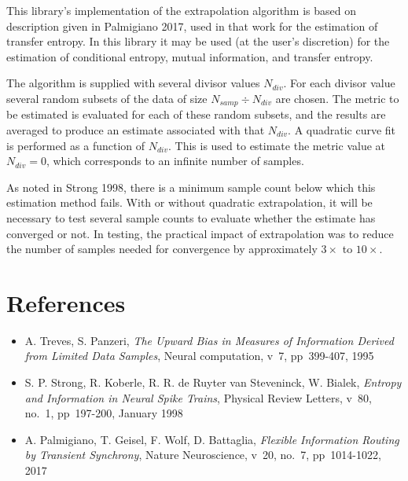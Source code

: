 This library's implementation of the extrapolation algorithm is based on
description given in Palmigiano 2017, used in that work for the estimation
of transfer entropy. In this library it may be used (at the user's
discretion) for the estimation of conditional entropy, mutual information,
and transfer entropy.

The algorithm is supplied with several divisor values $N_{div}$. For each
divisor value several random subsets of the data of size $N_{samp}
\div N_{div}$ are chosen. The metric to be estimated is evaluated for each
of these random subsets, and the results are averaged to produce an estimate
associated with that $N_{div}$. A quadratic curve fit is performed as a
function of $N_{div}$. This is used to estimate the metric value at
$N_{div} = 0$, which corresponds to an infinite number of samples.

As noted in Strong 1998, there is a minimum sample count below which this
estimation method fails. With or without quadratic extrapolation, it will
be necessary to test several sample counts to evaluate whether the estimate
has converged or not. In testing, the practical impact of extrapolation was
to reduce the number of samples needed for convergence by approximately
$3\times$ to $10\times$.

\section{References}
\label{sect-extrap-refs}

\begin{itemize}
%
\item A. Treves, S. Panzeri, \textit{The Upward Bias in Measures of
Information Derived from Limited Data Samples}, Neural computation,
v~7, pp~399-407, 1995
%
\item S. P. Strong, R. Koberle, R. R. de Ruyter van Steveninck, W. Bialek,
\textit{Entropy and Information in Neural Spike Trains},
Physical Review Letters, v~80, no.~1, pp~197-200, January 1998
%
\item A. Palmigiano, T. Geisel, F. Wolf, D. Battaglia,
\textit{Flexible Information Routing by Transient Synchrony},
Nature Neuroscience, v~20, no.~7, pp~1014-1022, 2017
%
\end{itemize}

%
